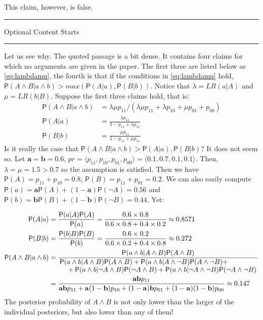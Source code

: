 \documentclass[10pt,dvipsnames,enabledeprecatedfontcommands]{scrartcl}
\newcommand{\ra}{\rangle}
\newcommand{\la}{\langle}
\newcommand{\n}{\neg}
\newcommand{\et}{\wedge}
\newcommand{\pr}[1]{\mathsf{P}(#1)}
\newcommand{\intermezzoa}{
	\begin{minipage}[c]{13cm}
	\begin{center}\rule{10cm}{0.4pt}



	\tiny{\sc Optional Content Starts}
	
	\vspace{-1mm}
	
	\rule{10cm}{0.4pt}\end{center}
	\end{minipage}\nopagebreak 
	}
\begin{document}
This claim, however, is false.

\intermezzoa

Let us see why. The quoted passage is a bit dense. It contains four
claims for which no arguments are given in the paper. The first three
are listed below as \eqref{eq:lambdamu}, the fourth is that if the
conditions in \eqref{eq:lambdamu} hold,
\(\pr{A\et B\vert a\et b}>max(\pr{A\vert a},\pr{B\vert b})\). Notice
that \(\lambda=LR(a\vert A)\) and \(\mu=LR(b\vert B)\). Suppose the
first three claims hold, that is: \begin{align}\label{eq:lambdamu}
 \pr{A\et B\vert  a\et b} &= \lambda \mu p_{11}/(\lambda \mu p_{11} + \lambda p_{10} +\mu p_{01} + p_{00})\\
 \pr{A\vert a} & = \frac{\lambda p_{11}}{1-p_{11}+\lambda p_{11}}\nonumber \\
 \pr{B\vert b} & = \frac{\mu p_{11}}{1-p_{11}+\mu p_{11}} \nonumber 
 \end{align} \noindent Is it really the case that
\(\pr{A\et B\vert a\et b}>\pr{A\vert a},\pr{B\vert b}\)? It does not
seem so. Let \(\mathbf{a}=\mathbf{b}=0.6\),
\(pr =\la p_{11},p_{10},p_{01},p_{00}\ra=\la 0.1, 0.7, 0.1, 0.1 \ra\).
Then, \(\lambda=\mu=1.5>0.7\) so the assumption is satisfied. Then we
have \(\pr{A}=p_{11}+p_{10}=0.8\), \(\pr{B}=p_{11}+p_{01}=0.2\). We can
also easily compute
\(\pr{a}=\mathbf{a}\pr{A}+(1-\mathbf{a})\pr{\n A}=0.56\) and
\(\pr{b}=\mathbf{b}\pr{B}+(1-\mathbf{b})\pr{\n B}=0.44\). Yet:

\begin{align*}
 \pr{A\vert a} & = \frac{\pr{a\vert A}\pr{A}}{\pr{a}} = \frac{0.6\times 0.8}{0.6\times 0.8 + 0.4\times 0.2}\approx 0.8571 \\
 \pr{B\vert b} & = \frac{\pr{b\vert B}\pr{B}}{\pr{b}} = \frac{0.6\times 0.2}{0.6\times 0.2 + 0.4\times 0.8}\approx 0.272 \\
 \pr{A\et B \vert a \et b} & = \frac{\pr{a\et b\vert A \et B}\pr{A\et B}}{\splitfrac{\pr{a\et b \vert A\et B}\pr{A\et B}+
   \pr{a\et b\vert A\et \n B}\pr{A\et \n B} +}{+ 
 \pr{a\et b \vert \n A \et B}\pr{\n A \et B} + \pr{a\et b \vert \n A \et \n B}\pr{\n A \et \n B}}} \\
 & = \frac{\mathbf{ab}p_{11}}{
   \mathbf{ab}p_{11} + \mathbf{a}(1-\mathbf{b})p_{10} + (1-\mathbf{a})\mathbf{b}p_{01} + (1-\mathbf{a})(1-\mathbf{b})p_{00}
 }  
    \approx 0.147
 \end{align*} The posterior probability of \(A\et B\) is not only lower
than the larger of the individual posteriors, but also lower than any of
them!
\end{document}
